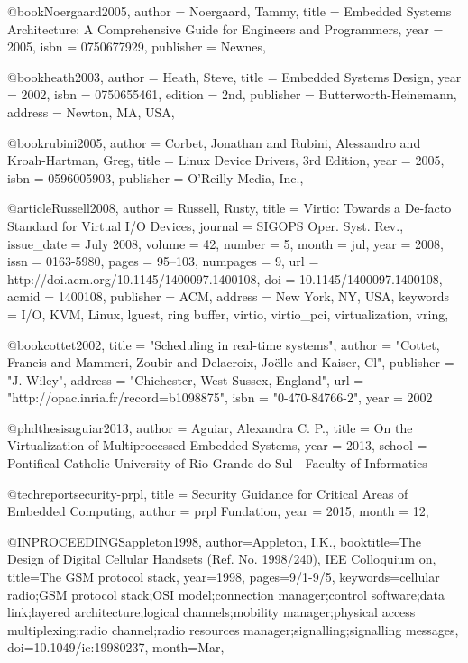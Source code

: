 @book{Noergaard2005,
 author = {Noergaard, Tammy},
 title = {Embedded Systems Architecture: A Comprehensive Guide for Engineers and Programmers},
 year = {2005},
 isbn = {0750677929},
 publisher = {Newnes},
} 

@book{heath2003,
 author = {Heath, Steve},
 title = {Embedded Systems Design},
 year = {2002},
 isbn = {0750655461},
 edition = {2nd},
 publisher = {Butterworth-Heinemann},
 address = {Newton, MA, USA},
} 

@book{rubini2005,
 author = {Corbet, Jonathan and Rubini, Alessandro and Kroah-Hartman, Greg},
 title = {Linux Device Drivers, 3rd Edition},
 year = {2005},
 isbn = {0596005903},
 publisher = {O'Reilly Media, Inc.},
} 

@article{Russell2008,
 author = {Russell, Rusty},
 title = {Virtio: Towards a De-facto Standard for Virtual I/O Devices},
 journal = {SIGOPS Oper. Syst. Rev.},
 issue_date = {July 2008},
 volume = {42},
 number = {5},
 month = jul,
 year = {2008},
 issn = {0163-5980},
 pages = {95--103},
 numpages = {9},
 url = {http://doi.acm.org/10.1145/1400097.1400108},
 doi = {10.1145/1400097.1400108},
 acmid = {1400108},
 publisher = {ACM},
 address = {New York, NY, USA},
 keywords = {I/O, KVM, Linux, lguest, ring buffer, virtio, virtio_pci, virtualization, vring},
} 

@book{cottet2002,
   title = "Scheduling in real-time systems",
   author = "Cottet, Francis and Mammeri, Zoubir and Delacroix, Joëlle and Kaiser, Cl",
   publisher = "J. Wiley",
   address = "Chichester, West Sussex, England",
   url = "http://opac.inria.fr/record=b1098875",
   isbn = "0-470-84766-2",
   year = 2002
}

@phdthesis{aguiar2013, 
	author = {Aguiar, Alexandra C. P.},
	title = {On the Virtualization of Multiprocessed Embedded Systems},
	year = {2013},
	school = {Pontifical Catholic University of Rio Grande do Sul - Faculty of Informatics}
}

@techreport{security-prpl,
     title = {{Security Guidance for Critical Areas of Embedded Computing}},
     author = {{prpl Fundation}},
     year = {2015},
     month = {12},
}

@INPROCEEDINGS{appleton1998, 
author={Appleton, I.K.}, 
booktitle={The Design of Digital Cellular Handsets (Ref. No. 1998/240), IEE Colloquium on}, 
title={The GSM protocol stack}, 
year={1998}, 
pages={9/1-9/5}, 
keywords={cellular radio;GSM protocol stack;OSI model;connection manager;control software;data link;layered architecture;logical channels;mobility manager;physical access multiplexing;radio channel;radio resources manager;signalling;signalling messages}, 
doi={10.1049/ic:19980237}, 
month={Mar},}

